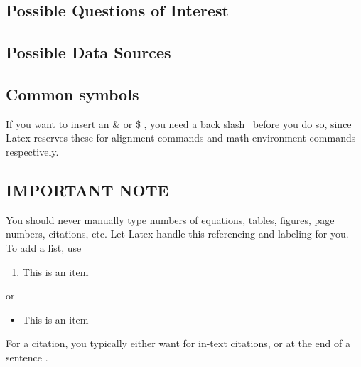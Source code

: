 \subsection{Possible Questions of Interest}

\subsection{Possible Data Sources}

\subsection{Common symbols}

If you want to insert an \& or \$ , you need a back slash \ before you do so, since Latex reserves these for alignment commands and math environment commands respectively.



\subsection{IMPORTANT NOTE}
You should never manually type numbers of equations, tables, figures, page numbers, citations, etc. Let Latex handle this referencing and labeling for you.\\

To add a list, use

\begin{enumerate}
    \item This is an item
\end{enumerate}

or 

\begin{itemize}
    \item This is an item
\end{itemize}

For a citation, you typically either want \citet{taylorBuffaloHuntInternational2011} for in-text citations, or at the end of a sentence \citep{taylorBuffaloHuntInternational2011}.